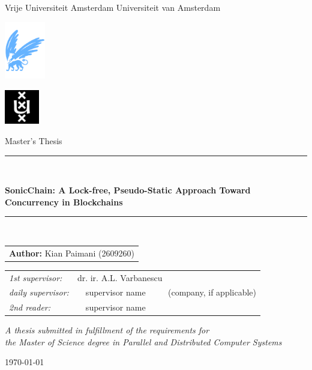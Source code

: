 \documentclass[twoside,11pt]{Latex/Classes/PhDthesisPSnPDF}
\theoremstyle{definition}
\theoremstyle{remark}
\begin{document}
\thispagestyle{empty}

\begin{center}

Vrije Universiteit Amsterdam \hspace*{2cm} Universiteit van Amsterdam

\vspace{1mm}

\hspace*{-7.5cm}\includegraphics[height=25mm]{0_frontmatter/figures/vu-griffioen.pdf}

\vspace*{-2cm}\hspace*{7.5cm}\includegraphics[height=15mm]{0_frontmatter/figures/uva_logo.jpg}

\vspace{2cm}

{\Large Master's Thesis}

\vspace*{1.5cm}

\rule{.9\linewidth}{.6pt}\\[0.4cm]
{\huge \bfseries SonicChain: A Lock-free, Pseudo-Static Approach Toward Concurrency in Blockchains\par}\vspace{0.4cm}
\rule{.9\linewidth}{.6pt}\\[1.5cm]

\vspace*{1.8mm}

{\Large
\begin{tabular}{l}
{\bf Author:} Kian Paimani (2609260)
\end{tabular}
}

\vspace*{1cm}

\begin{tabular}{ll}
{\it 1st supervisor:}   & dr. ir. A.L. Varbanescu \\
{\it daily supervisor:} & ~~supervisor name ~~~~ (company, if applicable) \\
{\it 2nd reader:}       & ~~supervisor name
\end{tabular}

\vspace*{2.5cm}

\textit{A thesis submitted in fulfillment of the requirements for\\ the Master of Science degree in Parallel and Distributed Computer Systems}

\vspace*{1.8cm}

\today\\[4cm] %

\end{center}
\end{document}
